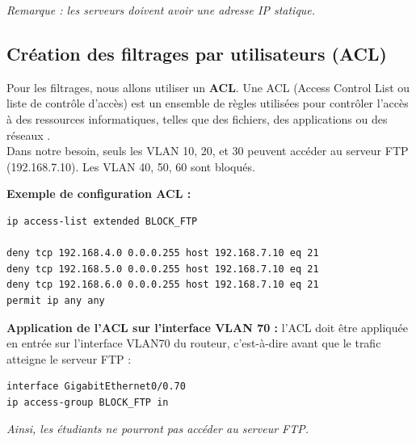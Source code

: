 \documentclass[a4paper,12pt]{article}
\begin{document}
\textit{Remarque : les serveurs doivent avoir une adresse IP statique.}

\subsection{Création des filtrages par utilisateurs (ACL)}
Pour les filtrages, nous allons utiliser un \textbf{ACL}.
Une ACL (Access Control List ou liste de contrôle d’accès) est un ensemble de règles utilisées
pour contrôler l’accès à des ressources informatiques, telles que des fichiers, des applications
ou des réseaux .\\

Dans notre besoin, seuls les VLAN 10, 20, et 30 peuvent accéder au serveur FTP (192.168.7.10). Les VLAN 40, 50, 60 sont bloqués.

\textbf{Exemple de configuration ACL :}
\begin{verbatim}
ip access-list extended BLOCK_FTP

deny tcp 192.168.4.0 0.0.0.255 host 192.168.7.10 eq 21
deny tcp 192.168.5.0 0.0.0.255 host 192.168.7.10 eq 21
deny tcp 192.168.6.0 0.0.0.255 host 192.168.7.10 eq 21
permit ip any any
\end{verbatim}

\textbf{Application de l’ACL sur l’interface VLAN 70 :} l'ACL doit être appliquée en entrée sur l’interface VLAN70 du routeur, c’est-à-dire avant
que le trafic atteigne le serveur FTP :
\begin{verbatim}
interface GigabitEthernet0/0.70
ip access-group BLOCK_FTP in
\end{verbatim}

\textit{Ainsi, les étudiants ne pourront pas accéder au serveur FTP.}
\end{document}
